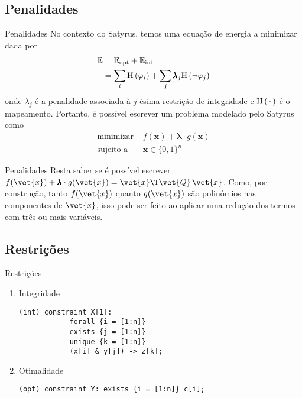 \documentclass[brazil, MathSerif, aspectratio = 169]{beamer}
\begin{document}
\subsection{Penalidades}
\begin{frame}{Penalidades}
    No contexto do Satyrus, temos uma equação de energia a minimizar dada por
    \begin{align*}
        \mathbb{E} & = \mathbb{E}_\text{opt} + \mathbb{E}_\text{int} \\
                   & = \sum_{i} \HH{\varphi_i}                       %
        + \sum_j \pmb{\lambda}_j \HH{\neg \varphi_j}
    \end{align*}
    onde $\lambda_j$ é a penalidade associada à $j$-ésima restrição de integridade e $\text{H}\left(\,\cdot\,\right)$ é o mapeamento. Portanto, é possível escrever um problema modelado pelo Satyrus como
    \begin{align*}
        \text{minimizar } & f(\mathbf{x}) + \pmb{\lambda} \cdot g(\mathbf{x}) \\
        \text{sujeito a } & \mathbf{x} \in \{0, 1\}^{n}
    \end{align*}
\end{frame}


\begin{frame}{Penalidades}%
    Resta saber se é possível escrever
    $f(\vet{x}) + \pmb{\lambda} \cdot g(\vet{x}) = \vet{x}\T \vet{Q}\, \vet{x}$.
    Como, por construção, tanto $f(\vet{x})$ quanto $g(\vet{x})$ são polinômios nas componentes de $\vet{x}$, isso pode ser feito ao aplicar uma redução dos termos com três ou mais variáveis.
\end{frame}

\subsection{Restrições}
\begin{frame}[fragile]{Restrições}%
    \begin{enumerate}
        \item Integridade
        \begin{lstlisting}[style=SATStyle, gobble=8]
        (int) constraint_X[1]:
            forall {i = [1:n]}
            exists {j = [1:n]}
            unique {k = [1:n]}
            (x[i] & y[j]) -> z[k];
        \end{lstlisting}
        \item Otimalidade
        \begin{lstlisting}[style=SATStyle, gobble=8]
        (opt) constraint_Y: exists {i = [1:n]} c[i];
        \end{lstlisting}
    \end{enumerate}

\end{frame}
\end{document}
